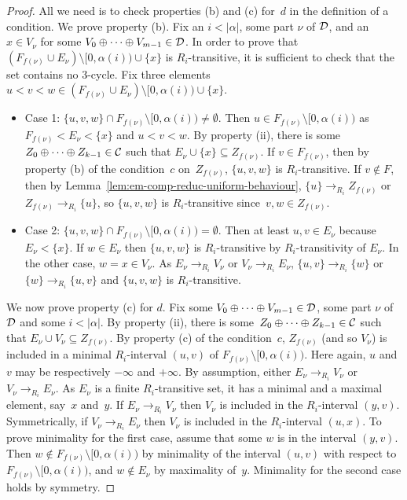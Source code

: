 \begin{proof}
All we need is to check properties (b) and (c) for~$d$ in the definition of a condition.
We prove property (b). Fix an $i < |\alpha|$, some part $\nu$ of $\mathcal{D}$, and an $x \in V_\nu$
for some $V_0 \oplus \dots \oplus V_{m-1} \in \mathcal{D}$. In order to prove that 
$(F_{f(\nu)} \cup E_\nu) \setminus [0, \alpha(i)) \cup \{x\}$
is $R_i$-transitive, it is sufficient to check that the set contains no 3-cycle.
Fix three elements $u < v < w \in (F_{f(\nu)} \cup E_\nu) \setminus [0, \alpha(i)) \cup \{x\}$.
\begin{itemize}
	\item Case 1: $\{u, v, w\} \cap F_{f(\nu)} \setminus [0, \alpha(i)) \neq \emptyset$. 
	Then $u \in F_{f(\nu)} \setminus [0, \alpha(i))$ as $F_{f(\nu)} < E_\nu < \{x\}$ and $u < v < w$.
	By property (ii), there is some $Z_0 \oplus \dots \oplus Z_{k-1} \in \mathcal{C}$ such that $E_\nu \cup \{x\} \subseteq Z_{f(\nu)}$.
	If $v \in F_{f(\nu)}$, then by property (b) of the condition~$c$ on~$Z_{f(\nu)}$, $\{u, v, w\}$ is $R_i$-transitive.
	If $v \not \in F$, then by Lemma~\ref{lem:em-comp-reduc-uniform-behaviour}, $\{u\} \to_{R_i} Z_{f(\nu)}$
	or $Z_{f(\nu)} \to_{R_i} \{u\}$, so $\{u, v, w\}$ is $R_i$-transitive since~$v, w \in Z_{f(\nu)}$.

	\item Case 2: $\{u, v, w\} \cap  F_{f(\nu)} \setminus [0, \alpha(i)) = \emptyset$. 
	Then at least $u, v \in E_\nu$ because $E_\nu < \{x\}$.
	If $w \in E_\nu$ then $\{u, v, w\}$ is $R_i$-transitive by $R_i$-transitivity of $E_\nu$.
	In the other case, $w = x \in V_\nu$. As $E_\nu \to_{R_i} V_\nu$ or $V_\nu \to_{R_i} E_\nu$,
	$\{u, v\} \to_{R_i} \{w\}$ or $\{w\} \to_{R_i} \{u, v\}$ and $\{u, v, w\}$ is $R_i$-transitive.
\end{itemize}

We now prove property (c) for $d$. Fix some $V_0 \oplus \dots \oplus V_{m-1} \in \mathcal{D}$, 
some part $\nu$ of~$\mathcal{D}$ and some $i < |\alpha|$.
By property (ii), there is some~$Z_0 \oplus \dots \oplus Z_{k-1} \in \mathcal{C}$ such that $E_\nu \cup V_\nu \subseteq Z_{f(\nu)}$.
By property (c) of the condition~$c$, $Z_{f(\nu)}$ (and so $V_\nu$) is included in a minimal $R_i$-interval $(u, v)$ of 
$F_{f(\nu)} \setminus [0, \alpha(i))$.
Here again, $u$ and $v$ may be respectively $-\infty$ and $+\infty$. 
By assumption, either $E_\nu \to_{R_i} V_\nu$ or $V_\nu \to_{R_i} E_\nu$. As $E_\nu$ is a finite $R_i$-transitive set,
it has a minimal and a maximal element, say~$x$ and~$y$. If $E_\nu \to_{R_i} V_\nu$
then $V_\nu$ is included in the $R_i$-interval $(y, v)$.
Symmetrically, if $V_\nu \to_{R_i} E_\nu$ then 
$V_\nu$ is included in the $R_i$-interval $(u, x)$.
To prove minimality for the first case, assume that some $w$ is in the interval $(y, v)$.
Then $w \not \in F_{f(\nu)} \setminus [0, \alpha(i))$ by minimality of the interval $(u, v)$ with respect to 
$F_{f(\nu)} \setminus [0, \alpha(i))$, and $w \not \in E_\nu$ by maximality of~$y$.
Minimality for the second case holds by symmetry.
\end{proof}

